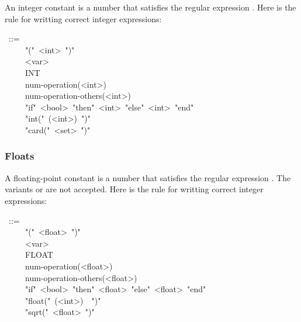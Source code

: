 \noindent An integer constant  is a number that satisfies the regular expression
\mdcode{{}[0-9]+}. Here is the rule for writting correct integer expressions:%
\begin{mdpre}%
~::=\\
~~~~\textbar{}~"("~{\textless{}int\textgreater{}}~")"\\
~~~~\textbar{}~{\textless{}var\textgreater{}}\\
~~~~\textbar{}~INT\\
~~~~\textbar{}~num-operation({\textless{}int\textgreater{}})\\
~~~~\textbar{}~num-operation-others({\textless{}int\textgreater{}})\\
~~~~\textbar{}~"if"~{\textless{}bool\textgreater{}}~"then"~{\textless{}int\textgreater{}}~"else"~{\textless{}int\textgreater{}}~"end"\\
~~~~\textbar{}~"int("~({\textless{}int\textgreater{}})~")"\\
~~~~\textbar{}~"card("~{\textless{}set\textgreater{}}~")"%
\end{mdpre}
\subsubsection{Floats}\label{sec-floats}%

\noindent A floating-point constant  is a number that satisfies the regular
expression . The variants  or  are not accepted.
Here is the rule for writting correct integer expressions:%
\begin{mdpre}%
~::=\\
~~~~\textbar{}~"("~{\textless{}float\textgreater{}}~")"\\
~~~~\textbar{}~{\textless{}var\textgreater{}}\\
~~~~\textbar{}~FLOAT\\
~~~~\textbar{}~num-operation({\textless{}float\textgreater{}})\\
~~~~\textbar{}~num-operation-others({\textless{}float\textgreater{}})\\
~~~~\textbar{}~"if"~{\textless{}bool\textgreater{}}~"then"~{\textless{}float\textgreater{}}~"else"~{\textless{}float\textgreater{}}~"end"\\
~~~~\textbar{}~"float("~({\textless{}int\textgreater{}})~~")"\\
~~~~\textbar{}~"sqrt("~{\textless{}float\textgreater{}}~")"%
\end{mdpre}
